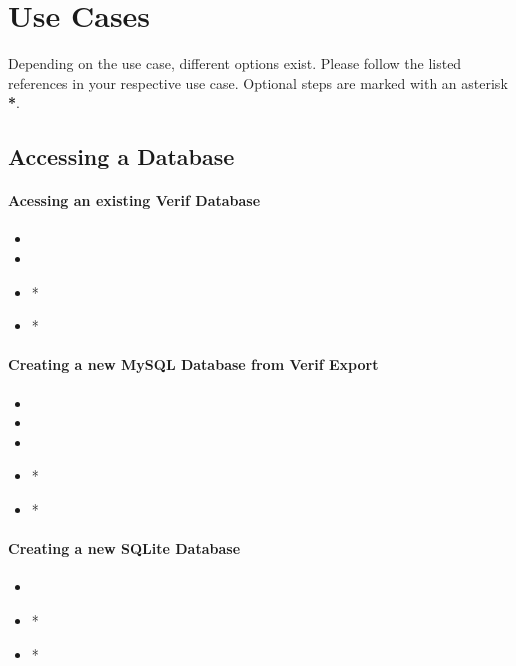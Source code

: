 \section{Use Cases}

Depending on the use case, different options exist. Please follow the listed references in your respective use case. Optional steps are marked with an asterisk \textbf{*}.

\subsection{Accessing a Database}

\paragraph{Acessing an existing Verif Database}

\begin{itemize}
 \item {}
 \item {}
 \item {}*
 \item {}*
\end{itemize}

\paragraph{Creating a new MySQL Database from Verif Export}

\begin{itemize}
 \item {}
 \item {}
 \item {}
 \item {}*
 \item {}*
\end{itemize}

\paragraph{Creating a new SQLite Database}

\begin{itemize}
 \item {}
 \item {}*
 \item {}*
\end{itemize}

